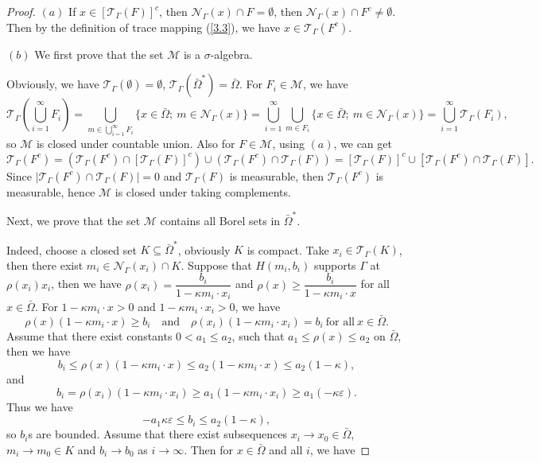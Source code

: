 \documentclass[a4paper,12pt,]{article}
\numberwithin{equation}{section}
\numberwithin{equation}{section} \allowdisplaybreaks
\begin{document}
\begin{proof}
  $(a)$ If $x \in [\mathcal{T}_{\Gamma}(F)]^{c}$, then $\mathcal{N}_{\Gamma}(x) \cap F = \emptyset$, then $\mathcal{N}_{\Gamma}(x) \cap F^{c} \neq \emptyset$. Then by the definition of trace mapping (\ref{3.3}), we have $x \in \mathcal{T}_{\Gamma}(F^{c})$.

  $(b)$ We first prove that the set $\mathcal{M}$ is a $\sigma$-algebra.

  Obviously, we have $\mathcal{T}_{\Gamma}(\emptyset) = \emptyset$, $\mathcal{T}_{\Gamma}(\bar{\Omega}^{\ast}) = \bar{\Omega}$.
  For $F_{i} \in \mathcal{M}$, we have
  $$\mathcal{T}_{\Gamma}(\bigcup\limits_{i=1}^{\infty}F_{i}) = \bigcup\limits_{m \in \bigcup\limits_{i=1}^{\infty}F_{i}}\{x \in \bar{\Omega};~m\in \mathcal{N}_{\Gamma}(x)\} = \bigcup\limits_{i=1}^{\infty}\bigcup\limits_{m \in F_{i}}\{x \in \bar{\Omega};~m\in \mathcal{N}_{\Gamma}(x)\} =\bigcup\limits_{i=1}^{\infty} \mathcal{T}_{\Gamma}(F_{i}),$$
  so $\mathcal{M}$ is closed under countable union. Also for $F \in \mathcal{M}$, using $(a)$, we can get
  $$\mathcal{T}_{\Gamma}(F^{c}) = (\mathcal{T}_{\Gamma}(F^{c}) \cap [\mathcal{T}_{\Gamma}(F)]^{c}) \cup (\mathcal{T}_{\Gamma}(F^{c}) \cap \mathcal{T}_{\Gamma}(F)) = [\mathcal{T}_{\Gamma}(F)]^{c} \cup [\mathcal{T}_{\Gamma}(F^{c}) \cap \mathcal{T}_{\Gamma}(F)].$$
  Since $\vert \mathcal{T}_{\Gamma}(F^{c}) \cap \mathcal{T}_{\Gamma}(F) \vert = 0$ and $\mathcal{T}_{\Gamma}(F)$ is measurable, then $\mathcal{T}_{\Gamma}(F^{c})$ is measurable, hence $\mathcal{M}$ is closed under taking complements.

  Next, we prove that the set $\mathcal{M}$ contains all Borel sets in $\bar{\Omega}^{\ast}$.

  Indeed, choose a closed set $K \subseteq \bar{\Omega}^{\ast}$, obviously $K$ is compact. Take $x_{i} \in \mathcal{T}_{\Gamma}(K)$, then there exist $m_{i} \in \mathcal{N}_{\Gamma}(x_{i}) \cap K$. Suppose that $H(m_{i},b_{i})$ supports $\Gamma$ at $\rho(x_{i})x_{i}$, then we have $\rho(x_{i}) = \dfrac{b_{i}}{1 - \kappa m_{i}\cdot x_{i}}$ and $\rho(x) \geq \dfrac{b_{i}}{1 - \kappa m_{i}\cdot x}$ for all $x\in \bar{\Omega}$. For $1 - \kappa m_{i}\cdot x >0$ and $1 - \kappa m_{i}\cdot x_{i} >0$, we have
  $$\rho(x)(1 - \kappa m_{i}\cdot x) \geq b_{i} \quad \text{and} \quad \rho(x_{i})(1 - \kappa m_{i}\cdot x_{i}) = b_{i} ~\text{for all} ~x\in \bar{\Omega}.$$
  Assume that there exist constants $0 < a_{1} \leq a_{2}$, such that $a_{1} \leq \rho(x) \leq a_{2}$ on $\bar{\Omega}$, then we have
  $$b_{i} \leq \rho(x)(1 - \kappa m_{i}\cdot x) \leq a_{2}(1 - \kappa m_{i}\cdot x) \leq a_{2}(1 - \kappa),$$
  and
  $$b_{i} = \rho(x_{i})(1 - \kappa m_{i}\cdot x_{i}) \geq a_{1}(1 - \kappa m_{i}\cdot x_{i}) \geq a_{1}(-\kappa \varepsilon).$$
  Thus we have
  $$-a_{1}\kappa \varepsilon \leq b_{i} \leq a_{2}(1 - \kappa),$$
  so $b_{i}$s are bounded. Assume that there exist subsequences $x_{i}\rightarrow x_{0} \in \bar{\Omega}$, $m_{i}\rightarrow m_{0} \in K$ and $b_{i} \rightarrow b_{0}$ as $i \rightarrow \infty$. Then for $x \in \bar{\Omega}$ and all $i$, we have


\end{proof}
\end{document}

